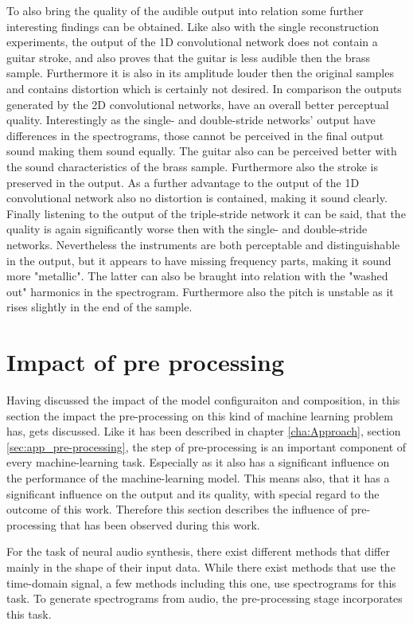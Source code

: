 To also bring the quality of the audible output into relation some further interesting findings can be obtained. Like also with the single reconstruction experiments, the output of the 1D convolutional network does not contain a guitar stroke, and also proves that the guitar is less audible then the brass sample. Furthermore it is also in its amplitude louder then the original samples and contains distortion which is certainly not desired. In comparison the outputs generated by the 2D convolutional networks, have an overall better perceptual quality. Interestingly as the single- and double-stride networks' output have differences in the spectrograms, those cannot be perceived in the final output sound making them sound equally. The guitar also can be perceived better with the sound characteristics of the brass sample. Furthermore also the stroke is preserved in the output. As a further advantage to the output of the 1D convolutional network also no distortion is contained, making it sound clearly. Finally listening to the output of the triple-stride network it can be said, that the quality is again significantly worse then with the single- and double-stride networks. Nevertheless the instruments are both perceptable and distinguishable in the output, but it appears to have missing frequency parts, making it sound more "metallic". The latter can also be braught into relation with the "washed out" harmonics in the spectrogram. Furthermore also the pitch is unstable as it rises slightly in the end of the sample. 


\section{Impact of pre processing}
\label{sec:disc_imp_pre_processing}
Having discussed the impact of the model configuraiton and composition, in this section the impact the pre-processing on this kind of machine learning problem has, gets discussed. Like it has been described in chapter \ref{cha:Approach}, section \ref{sec:app_pre-processing}, the step of pre-processing is an important component of every machine-learning task. Especially as it also has a significant influence on the performance of the machine-learning model. This means also, that it has a significant influence on the output and its quality, with special regard to the outcome of this work. Therefore this section describes the influence of pre-processing that has been observed during this work. 

For the task of neural audio synthesis, there exist different methods that differ mainly in the shape of their input data. While there exist methods that use the time-domain signal, a few methods including this one, use spectrograms for this task. To generate spectrograms from audio, the pre-processing stage incorporates this task. 

